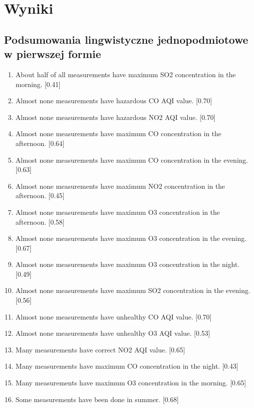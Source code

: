 \documentclass{classrep}
\begin{document}
    \section{Wyniki} {
        \subsection{Podsumowania lingwistyczne jednopodmiotowe w pierwszej formie} {
            \begin{enumerate}
                \item About half of all measurements have maximum SO2 concentration in the morning. [0.41]
                \item Almost none measurements have hazardous CO AQI value. [0.70]
                \item Almost none measurements have hazardous NO2 AQI value. [0.70]
                \item Almost none measurements have maximum CO concentration in the afternoon. [0.64]
                \item Almost none measurements have maximum CO concentration in the evening. [0.63]
                \item Almost none measurements have maximum NO2 concentration in the afternoon. [0.45]
                \item Almost none measurements have maximum O3 concentration in the afternoon. [0.58]
                \item Almost none measurements have maximum O3 concentration in the evening. [0.67]
                \item Almost none measurements have maximum O3 concentration in the night. [0.49]
                \item Almost none measurements have maximum SO2 concentration in the evening. [0.56]
                \item Almost none measurements have unhealthy CO AQI value. [0.70]
                \item Almost none measurements have unhealthy O3 AQI value. [0.53]
                \item Many measurements have correct NO2 AQI value. [0.65]
                \item Many measurements have maximum CO concentration in the night. [0.43]
                \item Many measurements have maximum O3 concentration in the morning. [0.65]
                \item Some measurements have been done in summer. [0.68]

\end{enumerate}}}
\end{document}
